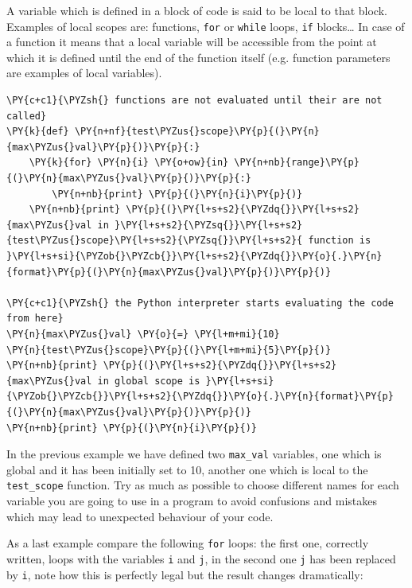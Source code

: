 A variable which is defined in a block of code is said to be local to that block. 
Examples of local scopes are: functions, \texttt{for} or \texttt{while} loops, \texttt{if} blocks\ldots 
In case of a function it means that a local variable will be accessible from the point at which it 
is defined until the end of the function itself (e.g. function parameters are examples of local variables).

\begin{codebox}[breakable, size=fbox, boxrule=1pt, pad at break*=1mm,colback=cellbackground, colframe=cellborder]
\begin{Verbatim}[commandchars=\\\{\}]
\PY{c+c1}{\PYZsh{} functions are not evaluated until their are not called}
\PY{k}{def} \PY{n+nf}{test\PYZus{}scope}\PY{p}{(}\PY{n}{max\PYZus{}val}\PY{p}{)}\PY{p}{:}
    \PY{k}{for} \PY{n}{i} \PY{o+ow}{in} \PY{n+nb}{range}\PY{p}{(}\PY{n}{max\PYZus{}val}\PY{p}{)}\PY{p}{:}
        \PY{n+nb}{print} \PY{p}{(}\PY{n}{i}\PY{p}{)}
    \PY{n+nb}{print} \PY{p}{(}\PY{l+s+s2}{\PYZdq{}}\PY{l+s+s2}{max\PYZus{}val in }\PY{l+s+s2}{\PYZsq{}}\PY{l+s+s2}{test\PYZus{}scope}\PY{l+s+s2}{\PYZsq{}}\PY{l+s+s2}{ function is }\PY{l+s+si}{\PYZob{}\PYZcb{}}\PY{l+s+s2}{\PYZdq{}}\PY{o}{.}\PY{n}{format}\PY{p}{(}\PY{n}{max\PYZus{}val}\PY{p}{)}\PY{p}{)}
    
\PY{c+c1}{\PYZsh{} the Python interpreter starts evaluating the code from here}
\PY{n}{max\PYZus{}val} \PY{o}{=} \PY{l+m+mi}{10}
\PY{n}{test\PYZus{}scope}\PY{p}{(}\PY{l+m+mi}{5}\PY{p}{)}
\PY{n+nb}{print} \PY{p}{(}\PY{l+s+s2}{\PYZdq{}}\PY{l+s+s2}{max\PYZus{}val in global scope is }\PY{l+s+si}{\PYZob{}\PYZcb{}}\PY{l+s+s2}{\PYZdq{}}\PY{o}{.}\PY{n}{format}\PY{p}{(}\PY{n}{max\PYZus{}val}\PY{p}{)}\PY{p}{)}
\PY{n+nb}{print} \PY{p}{(}\PY{n}{i}\PY{p}{)}
\end{Verbatim}
\end{codebox}

In the previous example we have defined two \texttt{max\_val} variables, one which is global 
and it has been initially set to 10, another one which is local to the \texttt{test\_scope} function.
Try as much as possible to choose different names for each variable you are going to use 
in a program to avoid confusions and mistakes which may lead to unexpected behaviour of your code.

As a last example compare the following \texttt{for} loops: the first one, correctly written, 
loops with the variables \texttt{i} and \texttt{j}, in the second one \texttt{j} has been 
replaced by \texttt{i}, note how this is perfectly legal but the result changes dramatically:

